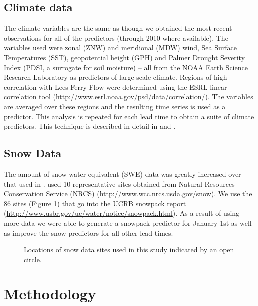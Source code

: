 \documentclass[final,5p,times,twocolumn,authoryear]{elsarticle}
\begin{document}
\subsection{Climate data}
The climate variables are the same as \citep{Bracken:2010cw} though we obtained the most recent observations for all of the predictors (through 2010 where available). The variables used were zonal (ZNW) and meridional (MDW) wind, Sea Surface Temperatures (SST), geopotential height (GPH) and Palmer Drought Severity Index (PDSI, a surrogate for soil moisture) -- all from the NOAA Earth Science Research Laboratory as predictors of large scale climate. Regions of high correlation with Lees Ferry Flow were determined using the ESRL linear correlation tool (\url{http://www.esrl.noaa.gov/psd/data/correlation/}). The variables are averaged over these regions and the resulting time series is used as a predictor. This analysis is repeated for each lead time to obtain a suite of climate predictors. This technique is described in detail in \cite{Grantz:2005ve} and \cite{Regonda2006}.

\subsection{Snow Data}
The amount of snow water equivalent (SWE) data was greatly increased over that used in \cite{Bracken:2010cw}. \cite{Bracken:2010cw} used 10 representative sites  obtained from Natural Resources Conservation Service (NRCS) (\url{http://www.wcc.nrcs.usda.gov/snow}). We use the 86 sites (Figure \ref{fig:map-snow}) that go into the UCRB snowpack report (\url{http://www.usbr.gov/uc/water/notice/snowpack.html}).  As a result of using more data we were able to generate a snowpack predictor for January 1st as well as improve the snow predictors for all other lead times. 


\begin{figure}[htbp] %
   \centering
   
   \caption{Locations of snow data sites used in this study indicated by an open circle.}
   \label{fig:map-snow}
\end{figure}


\section{Methodology}
\end{document}
